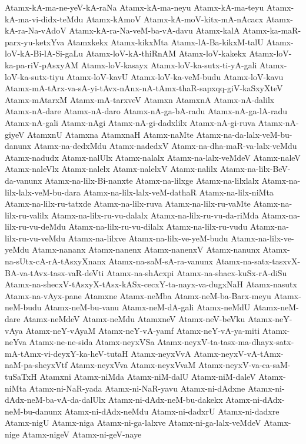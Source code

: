 {Atamx-kA-ma-ne-yeV-kA-raNa
Atamx-kA-ma-neyu
Atamx-kA-ma-teyu
Atamx-kA-ma-vi-didx-teMdu
Atamx-kAmoV
Atamx-kA-moV-kitx-mA-nAcacx
Atamx-kA-ra-Na-vAdoV
Atamx-kA-ra-Na-veM-ba-vA-davu
Atamx-kalA
Atamx-ka-maR-parx-yu-ketxYva
Atamxkekx
Atamx-kikxMta
Atamx-lA-Ba-kikxM-talU
Atamx-loV-kA-Bi-lA-Si-gaLu
Atamx-loV-kA-thiRnAM
Atamx-loV-kakekx
Atamx-loV-ka-pa-riV-pAsxyAM
Atamx-loV-kasayx
Atamx-loV-ka-sutx-ti-yA-gali
Atamx-loV-ka-sutx-tiyu
Atamx-loV-kavU
Atamx-loV-ka-veM-budu
Atamx-loV-kavu
Atamx-mA-tArx-va-sA-yi-tAvx-nAnx-nA-tAmx-thaR-sapxqq-giV-kaSxyXteV
Atamx-mAtarxM
Atamx-mA-tarxveV
Atamxn
AtamxnA
Atamx-nA-dalilx
Atamx-nA-dare
Atamx-nA-daro
Atamx-nA-ga-bA-radu
Atamx-nA-ga-lA-radu
Atamx-nA-gali
Atamx-nAgi
Atamx-nA-gi-dadxlilx
Atamx-nA-gi-ruva
Atamx-nA-giyeV
AtamxnU
Atamxna
AtamxnaH
Atamx-naMte
Atamx-na-da-lalx-veM-bu-danunx
Atamx-na-dedxMdu
Atamx-nadedxV
Atamx-na-dha-maR-va-lalx-veMdu
Atamx-nadudx
Atamx-nalUlx
Atamx-nalalx
Atamx-na-lalx-veMdeV
Atamx-naleV
Atamx-naleVlx
Atamx-nalelx
Atamx-nalelxV
Atamx-nalilx
Atamx-na-lilx-BeV-da-vanunx
Atamx-na-lilx-Bi-nanxte
Atamx-na-lilxge
Atamx-na-lilxlalx
Atamx-na-lilx-lalx-veM-bu-dara
Atamx-na-lilx-lalx-veM-dathaR
Atamx-na-lilx-niMta
Atamx-na-lilx-ru-tatxde
Atamx-na-lilx-ruva
Atamx-na-lilx-ru-vaMte
Atamx-na-lilx-ru-valilx
Atamx-na-lilx-ru-vu-dalalx
Atamx-na-lilx-ru-vu-da-riMda
Atamx-na-lilx-ru-vu-deMdu
Atamx-na-lilx-ru-vu-dilalx
Atamx-na-lilx-ru-vudu
Atamx-na-lilx-ru-vu-veMdu
Atamx-na-lilxve
Atamx-na-lilx-ve-yeM-budu
Atamx-na-lilx-ve-yeMdu
Atamx-nananx
Atamx-nanenx
Atamx-nanenxV
Atamx-nanunx
Atamx-na-sUtx-cA-rA-tAsxyXnanx
Atamx-na-saM-sA-ra-vanunx
Atamx-na-satx-tasxvX-BA-va-tAvx-tasx-vaR-deVti
Atamx-na-shAcxpi
Atamx-na-shacx-kuSx-rA-diSu
Atamx-na-shecxV-tAsxyX-tAsx-kASx-cecxY-ta-nayx-va-dugxNaH
Atamx-nasutx
Atamx-na-vAyx-pane
Atamxne
Atamx-neMba
Atamx-neM-ba-Barx-meyu
Atamx-neM-budu
Atamx-neM-bu-vanu
Atamx-neM-dA-gali
Atamx-neMdU
Atamx-neM-dare
Atamx-neMdeV
Atamx-neMdu
AtamxneV
Atamx-neV-beVku
Atamx-neY-vAya
Atamx-neY-vAyaM
Atamx-neY-vA-yamf
Atamx-neY-vA-ya-miti
Atamx-neYva
Atamx-ne-ne-sida
Atamx-neyxVSa
Atamx-neyxV-ta-tasx-ma-dhayx-satx-mA-tAmx-vi-deyxY-ka-heV-tutaH
Atamx-neyxVvA
Atamx-neyxV-vA-tAmx-naM-pa-sheyxVtf
Atamx-neyxVva
Atamx-neyxVvaM
Atamx-neyxV-va-ca-saM-tuSaTxH
Atamxni
Atamx-niMda
Atamx-niM-dalU
Atamx-niM-daleV
Atamx-niMta
Atamx-ni-NaR-yada
Atamx-ni-NaR-yavu
Atamx-ni-dAdxne
Atamx-ni-dAdx-neM-ba-vA-da-dalUlx
Atamx-ni-dAdx-neM-bu-dakekx
Atamx-ni-dAdx-neM-bu-danunx
Atamx-ni-dAdx-neMdu
Atamx-ni-dadxrU
Atamx-ni-dadxre
Atamx-nigU
Atamx-niga
Atamx-ni-ga-lalxve
Atamx-ni-ga-lalx-veMdeV
Atamx-nige
Atamx-nigeV
Atamx-ni-geV-naye
}
